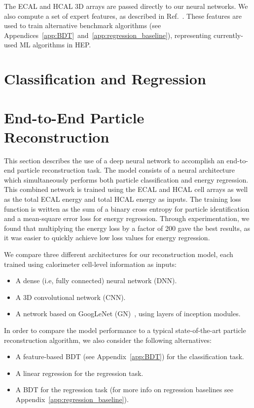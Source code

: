 
The ECAL and HCAL 3D arrays are passed directly to our neural networks. We also compute a set of expert features, as described in Ref.~\cite{NIPS}. These features are used to train alternative benchmark algorithms (see Appendices~\ref{app:BDT}~and~\ref{app:regression_baseline}), representing currently-used ML algorithms in HEP.

\section{Classification and Regression}

\section{End-to-End Particle Reconstruction}
\label{sec:reco}

This section describes the use of a deep neural network to accomplish an end-to-end particle reconstruction task. The model consists of a neural architecture which simultaneously performs both particle classification and energy regression. This combined network is trained using the ECAL and HCAL cell arrays as well as the total ECAL energy and total HCAL energy as inputs. The training loss function is written as the sum of a binary cross entropy for particle identification and a mean-square error loss for energy regression. Through experimentation, we found that multiplying the energy loss by a factor of 200 gave the best results, as it was easier to quickly achieve low loss values for energy regression.

We compare three different architectures for our reconstruction model, each trained using calorimeter cell-level information as inputs:
\begin{itemize}
\item A dense (i.e, fully connected) neural network (DNN).
\item A 3D convolutional network (CNN).
\item A network based on GoogLeNet (GN)~\cite{GoogLeNet}, using layers of inception modules.
\end{itemize}

In order to compare the model performance to a typical state-of-the-art particle reconstruction algorithm, we also consider the following alternatives:
\begin{itemize}
    \item A feature-based BDT (see Appendix~\ref{app:BDT}) for the classification task.
    \item A linear regression for the regression task.
    \item A BDT for the regression task (for more info on regression baselines see Appendix~\ref{app:regression_baseline}).
\end{itemize}

